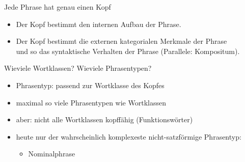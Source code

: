 \begin{frame}
  {Jede Phrase hat genau einen Kopf}
  \pause
  \pause
  \Halbzeile
  \begin{itemize}[<+->]
    \item Der Kopf bestimmt den \alert{internen Aufbau} der Phrase.
    \item Der Kopf bestimmt die \alert{externen kategorialen Merkmale} der Phrase\\
      und so das syntaktische Verhalten der Phrase (Parallele: \alert{Kompositum}).
  \end{itemize}
\end{frame}


\begin{frame}
  {Wieviele Wortklassen? Wieviele Phrasentypen?}
  \pause
  \begin{itemize}[<+->]
    \item \alert{Phrasentyp: passend zur Wortklasse des Kopfes}
    \item maximal so viele Phrasentypen wie Wortklassen
    \item aber: nicht alle Wortklassen kopffähig (\alert{Funktionswörter})
      \Zeile
    \item heute nur der wahrscheinlich komplexeste nicht-satzförmige Phrasentyp:
      \begin{itemize}[<+->]
        \item Nominalphrase
      \end{itemize}
  \end{itemize}
\end{frame}

